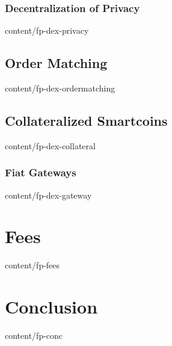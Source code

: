 \documentclass[conference,final,10pt,a4paper]{IEEEtran}
\begin{document}
\subsubsection { Decentralization of Privacy                     }  { content/fp-dex-privacy         } 
\subsection    { Order Matching                                  }  { content/fp-dex-ordermatching   } 
\subsection    { Collateralized Smartcoins                       }  { content/fp-dex-collateral      } 
\subsubsection { Fiat Gateways                                   }  { content/fp-dex-gateway         } 


\section       { Fees                                            }  { content/fp-fees                }

\section       { Conclusion                                      }  { content/fp-conc                } 


\end{document}
